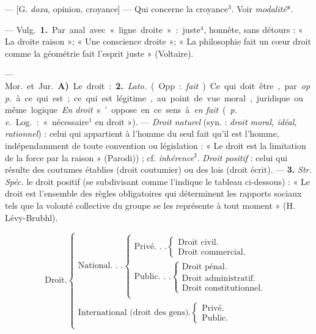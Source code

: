 \begin{itemize}[leftmargin=1cm, label=, itemsep=1pt]
 — [G. {\it doxa}, opinion, croyance]
— Qui concerne la croyance$^3$. Voir
{\it modalité}*.

 — \si{Vulg.} {\bf 1.} Par anal. avec
« ligne droite » : juste$^4$, honnête, sans
détours : « La droite raison »; « Une
conscience droite »; « La philosophie
fait un cœur droit comme la géométrie fait l'esprit juste » (Voltaire).

 — \si{Mor.} et \si{Jur.} {\bf A)} Le
droit : {\bf 2.} {\it Lato.} (Opp. : {\it fait}). Ce qui
doit être, par {\it opp.} à ce qui est; ce
qui est légitime, au point de vue
moral, juridique ou même logique.
{\it En droit} s’oppose en ce sens à {\it en fait}
({\it p. e.} \si{Log.} : « nécessaire$^1$ en droit »).
— {\it Droit naturel} (syn. : {\it droit moral,
idéal, rationnel}) : celui qui appartient
à l’homme du seul fait qu'il est
l’homme, indépendamment de toute
convention ou législation : « Le droit
est la limitation de la force par la
raison » (Parodi)) ; cf. {\it inhérence}$^3$. {\it Droit
positif} : celui qui résulte des coutumes établies (droit coutumier) ou
des lois (droit écrit). — {\bf 3.} {\it Str.} {\it Spéc.}
le droit positif (se subdivisant comme
l'indique le tableau ci-dessous) :
« Le droit est l’ensemble des règles
obligatoires qui déterminent les
rapports sociaux tels que la volonté
collective du groupe se les représente
à tout moment » (H. Lévy-Brubhl).

\begin{equation*}
\text{Droit.}
\left\{ \begin{array}{l}
  \text{National. . .}
    \left\{ \begin{array}{l}
      \text{Privé. . .}
        \left\{ \begin{array}{l}
          \text{Droit civil.}\\
          \text{Droit commercial.}
        \end{array}
        \right. \\
      \text{Public. . .}
        \left\{ \begin{array}{l}
          \text{Droit pénal.}\\
          \text{Droit administratif.}\\
          \text{Droit constitutionnel.}
        \end{array}
        \right. \\
    \end{array}
    \right. \\
  \text{International (droit des gens).}
        \left\{ \begin{array}{l}
          \text{Privé.}\\
          \text{Public.}
        \end{array}
        \right. \\
\end{array}
\right.
\end{equation*}


\end{itemize}
